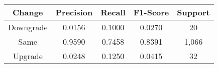 \footnotesize
\begin{tabular}{ccccc}
\toprule
Change & Precision & Recall & F1-Score & Support \\
\midrule
Downgrade & 0.0156 & 0.1000 & 0.0270 & 20 \\
Same & 0.9590 & 0.7458 & 0.8391 & 1,066 \\
Upgrade & 0.0248 & 0.1250 & 0.0415 & 32 \\
\bottomrule
\end{tabular}

\normalsize